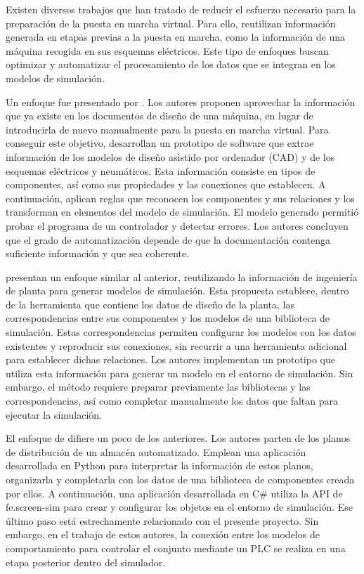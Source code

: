 Existen diversos trabajos que han tratado de reducir el esfuerzo necesario para la preparación de la puesta en marcha virtual. Para ello, reutilizan información generada en etapas previas a la puesta en marcha, como la información de una máquina recogida en sus esquemas eléctricos. Este tipo de enfoques buscan optimizar y automatizar el procesamiento de los datos que se integran en los modelos de simulación.


Un enfoque fue presentado por . Los autores proponen aprovechar la información que ya existe en los documentos de diseño de una máquina, en lugar de introducirla de nuevo manualmente para la puesta en marcha virtual. Para conseguir este objetivo, desarrollan un prototipo de software que extrae información de los modelos de diseño asistido por ordenador (CAD) y de los esquemas eléctricos y neumáticos. Esta información consiste en tipos de componentes, así como sus propiedades y las conexiones que establecen. A continuación, aplican reglas que reconocen los componentes y sus relaciones y los transforman en elementos del modelo de simulación. El modelo generado permitió probar el programa de un controlador y detectar errores. Los autores concluyen que el grado de automatización depende de que la documentación contenga suficiente información y que sea coherente. 


 presentan un enfoque similar al anterior, reutilizando la información de ingeniería de planta para generar modelos de simulación. Esta propuesta establece, dentro de la herramienta que contiene los datos de diseño de la planta, las correspondencias entre sus componentes y los modelos de una biblioteca de simulación. Estas correspondencias permiten configurar los modelos con los datos existentes y reproducir sus conexiones, sin recurrir a una herramienta adicional para establecer dichas relaciones. Los autores implementan un prototipo que utiliza esta información para generar un modelo en el entorno de simulación. Sin embargo, el método requiere preparar previamente las bibliotecas y las correspondencias, así como completar manualmente los datos que faltan para ejecutar la simulación.


El enfoque de  difiere un poco de los anteriores. Los autores parten de los planos de distribución de un almacén automatizado. Emplean una aplicación desarrollada en Python para interpretar la información de estos planos, organizarla y completarla con los datos de una biblioteca de componentes creada por ellos. A continuación, una aplicación desarrollada en C\# utiliza la API de fe.screen-sim para crear y configurar los objetos en el entorno de simulación. Ese último paso está estrechamente relacionado con el presente proyecto. Sin embargo, en el trabajo de estos autores, la conexión entre los modelos de comportamiento para controlar el conjunto mediante un PLC se realiza en una etapa posterior dentro del simulador.


